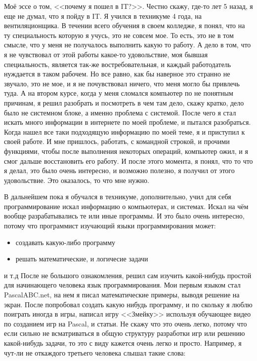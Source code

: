 Моё эссе о том, <<почему я пошел в IT?>>. Честно скажу, где-то лет 5 назад, я еще не думал, что я пойду в IT. Я учился в техникуме 4 года, на вентиляционщика. В течении всего обучения в своем колледже, я понял, что на ту специальность которую я учусь, это не совсем мое. То есть, это не в том смысле, что у меня не получалось выполнить какую то работу. А дело в том, что я не чувствовал от этой работы какое-то удовольствие, моя бывшая специальность, является так-же востребовательная, и каждый работодатель нуждается в таком рабочем. Но все равно, как бы наверное это странно не звучало, это не мое, и я не почувствовал ничего, что меня могло бы привлечь туда. А на втором курсе, когда у меня сломался компьютер по не понятным причинам, я решил разобрать и посмотреть в чем там дело, скажу кратко, дело было не системном блоке, а именно проблема с системой. После чего я стал искать много информации в интернете по моей проблеме, и пытался разобраться. Когда нашел все таки подходящую информацию по моей теме, я и приступил к своей работе. И мне пришлось, работать, с командной строкой, и прочими функциями, чтобы после выполнения некоторых операций, компьютер ожил, и я смог дальше восстановить его работу. И после этого момента, я понял, что то что я делал, это было очень интересно, и возможно полезно, я получил от этого удовольствие. Это оказалось, то что мне нужно.

В дальнейшем пока я обучался в техникуме, дополнительно, учил для себя программирование искал информацию о компьютерах, и системах. Искал на чём вообще разрабатывались те или иные программы. И это было очень интересно, потому что программист изучающий языки программирования может:
\begin{itemize}
	\item{создавать какую-либо программу}
	\item{решать математические, и логичесие задачи}
\end{itemize}
и т.д
После не большого ознакомления, решил сам изучить какой-нибудь простой для начинающего человека язык программирования. Мои первым языком стал PascalABC.net, на нем я писал математические примеры, выводя решение на экран. После попробовал создать какую нибудь программу, и по скольку я люблю поиграть иногда в игры, написал игру <<Змейку>> используя обучающее видео по созданием игр на Pascal, и статьи. Не скажу что это очень легко, потому что если сильно не всматриваться в общую структуру разработки игр или решению какой-нибудь задачи, то это с виду кажется очень легко и просто.
Например, я чут-ли не откаждого третьего человека слышал такие слова:

